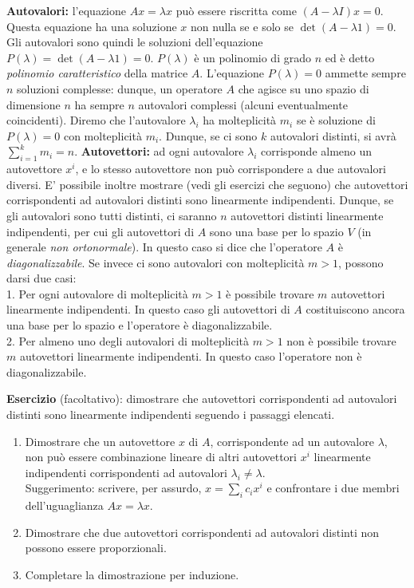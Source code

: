 \documentclass[a4paper,10pt]{article}
\newcommand{\linea}{\vskip14pt \noindent}
\begin{document}
\linea
{\bf Autovalori:} l'equazione $Ax=\lambda x$ pu\`o essere riscritta come $(A-\lambda I)x=0$.
Questa equazione ha una soluzione
$x$ non nulla se e solo se $\det (A-\lambda 1) = 0$. Gli autovalori sono quindi le soluzioni dell'equazione
$P(\lambda)=\det (A-\lambda 1) = 0$. $P(\lambda)$ \`e un polinomio di grado $n$ ed \`e detto 
{\it polinomio caratteristico} della matrice $A$. L'equazione $P(\lambda)=0$ ammette
sempre $n$ soluzioni complesse: dunque, un operatore $A$ che agisce su uno spazio di dimensione $n$ ha
sempre $n$ autovalori complessi (alcuni eventualmente coincidenti). Diremo che l'autovalore $\lambda_i$ ha
molteplicit\`a $m_i$ se \`e soluzione di $P(\lambda)=0$ con molteplicit\`a $m_i$. Dunque, se
ci sono $k$ autovalori distinti, si avr\`a $\sum_{i=1}^k m_i =n$.
\vskip5pt
\noindent
{\bf Autovettori:} ad ogni autovalore $\lambda_i$ corrisponde almeno un autovettore $x^i$, e lo stesso
autovettore non pu\`o corrispondere a due autovalori diversi.
E' possibile inoltre mostrare (vedi gli esercizi che seguono) che  autovettori corrispondenti
ad autovalori distinti sono linearmente indipendenti.
Dunque, se gli autovalori sono tutti distinti, ci saranno $n$ autovettori distinti linearmente indipendenti,
per cui gli autovettori di $A$ sono una base per lo spazio $V$ (in generale {\it non ortonormale}).
In questo caso si dice che l'operatore $A$ \`e {\it diagonalizzabile}. Se invece ci sono autovalori con
molteplicit\`a $m > 1$, possono darsi due casi: \\
1. Per ogni autovalore di molteplicit\`a $m>1$ \`e possibile trovare $m$ autovettori linearmente
indipendenti. In questo caso gli autovettori di $A$ costituiscono ancora una base per lo spazio e
l'operatore \`e diagonalizzabile. \\
2. Per almeno uno degli autovalori di molteplicit\`a $m>1$ non \`e possibile trovare $m$ autovettori
linearmente indipendenti. In questo caso l'operatore non \`e diagonalizzabile.

\linea
{\bf Esercizio} (facoltativo): dimostrare che autovettori corrispondenti
ad autovalori distinti sono linearmente indipendenti seguendo i passaggi elencati.
\begin{enumerate}
\item Dimostrare che un
autovettore $x$ di $A$, corrispondente ad un autovalore $\lambda$, non pu\`o essere combinazione
lineare di altri autovettori $x^i$ linearmente indipendenti
corrispondenti ad autovalori $\lambda_i \neq \lambda$. \\
Suggerimento: scrivere, per assurdo, $x = \sum_i c_i x^i$ e confrontare i due membri dell'uguaglianza
$Ax=\lambda x$.
\item Dimostrare che due autovettori corrispondenti ad autovalori distinti non possono essere proporzionali.
\item Completare la dimostrazione per induzione.
\end{enumerate}
\end{document}
